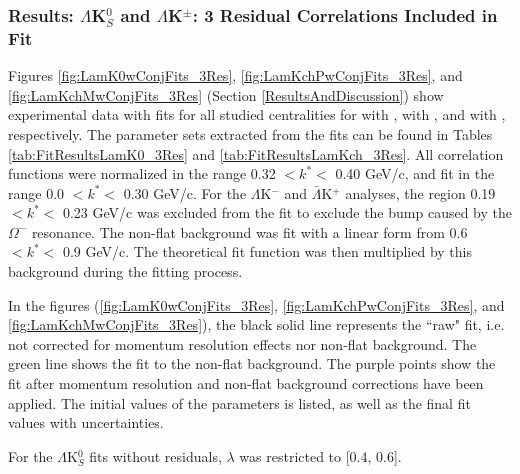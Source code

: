 \documentclass[../AnalysisNoteJBuxton.tex]{subfiles}
\begin{document}
\subsubsection{Results: \texorpdfstring{$\Lambda$K$^{0}_{S}$ and $\Lambda$K$^{\pm}$: 3 Residual Correlations Included in Fit}{TEXT}}
\label{ResultsLamK_3Res}

Figures \ref{fig:LamK0wConjFits_3Res}, \ref{fig:LamKchPwConjFits_3Res}, and \ref{fig:LamKchMwConjFits_3Res} (Section \ref{ResultsAndDiscussion}) show experimental data with fits for all studied centralities for \LamKs with \ALamKs, \LamKchP with \ALamKchM, and \LamKchM with \ALamKchP, respectively.
The parameter sets extracted from the fits can be found in Tables \ref{tab:FitResultsLamK0_3Res} and \ref{tab:FitResultsLamKch_3Res}.
All correlation functions were normalized in the range 0.32 $< k^{*} <$ 0.40 GeV/c, and fit in the range 0.0 $< k^{*} <$ 0.30 GeV/c.
For the $\Lambda$K$^{-}$ and $\bar{\Lambda}$K$^{+}$ analyses, the region 0.19 $< k^{*} <$ 0.23 GeV/c was excluded from the fit to exclude the bump caused by the $\Omega^{-}$ resonance.
The non-flat background was fit with a linear form from 0.6 $< k^{*} <$ 0.9 GeV/c.
The theoretical fit function was then multiplied by this background during the fitting process.

In the figures (\ref{fig:LamK0wConjFits_3Res}, \ref{fig:LamKchPwConjFits_3Res}, and \ref{fig:LamKchMwConjFits_3Res}), the black solid line represents the ``raw" fit, i.e. not corrected for momentum resolution effects nor non-flat background.
The green line shows the fit to the non-flat background.  The purple points show the fit after momentum resolution and non-flat background corrections have been applied.
The initial values of the parameters is listed, as well as the final fit values with uncertainties.

For the $\Lambda$K$^{0}_{S}$ fits without residuals, $\lambda$ was restricted to [0.4, 0.6].
\end{document}
